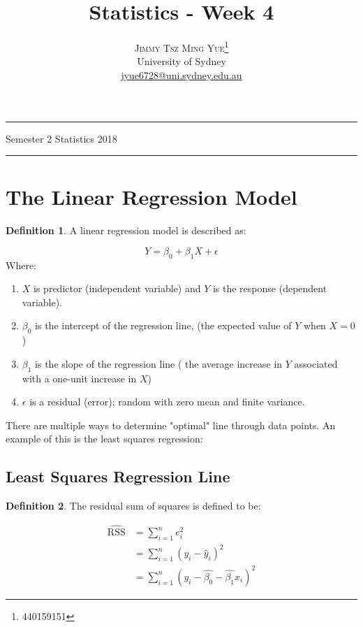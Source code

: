 \documentclass[twoside]{article}
\title{\vspace{-15mm}\fontsize{24pt}{10pt}\selectfont\textbf{Statistics - Week 4}} %
\author{
\large
\textsc{Jimmy Tsz Ming Yue}\thanks{440159151}\\[2mm] %
\normalsize University of Sydney \\ %
\normalsize \href{mailto:jyue6728@uni.sydney.edu.au}{jyue6728@uni.sydney.edu.au} %
\vspace{-5mm}
}
\date{}
\theoremstyle{definition}
\theoremstyle{definition}
\newtheorem*{proof1}{Definition}
\newenvironment{ddef}{\begin{dBox}\begin{proof1}}{\hfill{\scriptsize}\end{proof1}\end{dBox}}
\begin{document}


\maketitle %

\thispagestyle{fancy} %
\hrule \smallskip

\noindent Semester 2 \quad Statistics \hspace{10.5
cm} 2018
\smallskip
\hrule
\smallskip
\tableofcontents
\section{The Linear Regression Model}

\begin{ddef}

A linear regression model is described as:

\begin{equation}
Y = \beta_0 + \beta_1 X + \epsilon
\end{equation}
Where:

\begin{enumerate}
  \item $X$ is predictor (independent variable) and $Y$ is the response (dependent variable).
  \item $\beta_0$ is the intercept of the regression line, (the expected value of $Y$ when $X=0$)
  \item $\beta_1$ is the slope of the regression line ( the average increase in $Y$ associated with a one-unit increase in $X$)
  \item $\epsilon$ is a residual (error); random with zero mean and finite variance.
\end{enumerate}
\end{ddef}

There are multiple ways to determine "optimal" line through data points. An example of this is the least squares regression:

\subsection{Least Squares Regression Line}
\begin{ddef}
The residual sum of squares is defined to be:

\begin{align*}
\hat{\text{RSS}}& =\sum_{i=1}^n e^2_i\\
& = \sum^n_{i=1} (y_i - \hat{y}_i)^2\\
& = \sum^n_{i=1} (y_i - \hat{\beta_0} - \hat{\beta_1}x_i)^2 
\end{align*}
\end{ddef}
\end{document}

